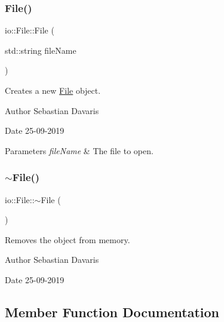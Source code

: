 \subsubsection{\texorpdfstring{File()}{File()}}
{\footnotesize\ttfamily io\+::\+File\+::\+File (\begin{DoxyParamCaption}\item[{std\+::string}]{file\+Name }\end{DoxyParamCaption})\hspace{0.3cm}{\ttfamily [explicit]}}

Creates a new \hyperlink{classio_1_1_file}{File} object. \begin{DoxyAuthor}{Author}
Sebastian Davaris 
\end{DoxyAuthor}
\begin{DoxyDate}{Date}
25-\/09-\/2019 
\end{DoxyDate}

\begin{DoxyParams}{Parameters}
{\em file\+Name} & The file to open. \\
\hline
\end{DoxyParams}
\mbox{\label{classio_1_1_file_af1c861a626e238b71e1074ab27a666b6}} 
\subsubsection{\texorpdfstring{$\sim$\+File()}{~File()}}
{\footnotesize\ttfamily io\+::\+File\+::$\sim$\+File (\begin{DoxyParamCaption}{ }\end{DoxyParamCaption})}

Removes the object from memory. \begin{DoxyAuthor}{Author}
Sebastian Davaris 
\end{DoxyAuthor}
\begin{DoxyDate}{Date}
25-\/09-\/2019 
\end{DoxyDate}


\subsection{Member Function Documentation}
\mbox{\label{classio_1_1_file_ab8996ee8da7ddf32e7e872f3e2f39ac9}} 
